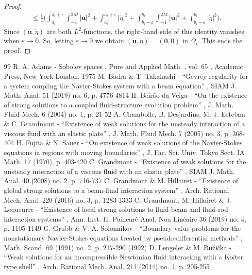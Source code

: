 \documentclass[11pt]{article}
\theoremstyle{remark}
\theoremstyle{definition}
\newcommand{\ug}{\boldsymbol{u}}
\newcommand{\BS}[1]{\boldsymbol{#1}}
\newcommand{\etap}{\dot{\eta}}
\begin{document}
\begin{proof}
\begin{multline}
\leq \frac{1}{4}\biggl(\int_{a_i}^{a_i+\varepsilon} \int_{-1}^{2M} \vert\ug\vert^{2}+\int_{a_i}^{a_i+\varepsilon}\vert\etap\vert^{2}
+\int_{b_i-\varepsilon}^{b_i} \int_{-1}^{2M} \vert\ug\vert^{2}+\int_{b_i-\varepsilon}^{b_i}\vert\etap\vert^{2} \biggr).
\end{multline}
Since $(\ug,\dot{\eta})$ are both $L^2$-functions, the right-hand side of this identity vanishes when $\varepsilon \to 0$. So, letting $\varepsilon\to 0$ we obtain $(\ug,\etap)=(\BS{0},0)$ in $\Omega_i$. This ends the proof.
\end{proof}


\begin{thebibliography}{99}
 R. A. Adams - Sobolev spaces , Pure and Applied Math. , vol. 65 , Academic Press, New York-London, 1975
 M. Badra \& T. Takahashi - “Gevrey regularity for a system coupling the Navier-Stokes system with a beam equation” , SIAM J. Math. Anal. 51 (2019) no. 6, p. 4776-4814
 H. Beirão da Veiga - “On the existence of strong solutions to a coupled fluid-structure evolution problem” , J. Math. Fluid Mech. 6 (2004) no. 1, p. 21-52
 A. Chambolle, B. Desjardins, M. J. Esteban \& C. Grandmont - “Existence of weak solutions for the unsteady interaction of a viscous fluid with an elastic plate” , J. Math. Fluid Mech. 7 (2005) no. 3, p. 368-404
 H. Fujita \& N. Sauer - “On existence of weak solutions of the Navier-Stokes equations in regions with moving boundaries” , J. Fac. Sci. Univ. Tokyo Sect. IA Math. 17 (1970), p. 403-420
 C. Grandmont - “Existence of weak solutions for the unsteady interaction of a viscous fluid with an elastic plate” , SIAM J. Math. Anal. 40 (2008) no. 2, p. 716-737
 C. Grandmont \& M. Hillairet - “Existence of global strong solutions to a beam-fluid interaction system” , Arch. Rational Mech. Anal. 220 (2016) no. 3, p. 1283-1333
 C. Grandmont, M. Hillairet \& J. Lequeurre - “Existence of local strong solutions to fluid-beam and fluid-rod interaction systems” , Ann. Inst. H. Poincaré Anal. Non Linéaire 36 (2019) no. 4, p. 1105-1149
 G. Grubb \& V. A. Solonnikov - “Boundary value problems for the nonstationary Navier-Stokes equations treated by pseudo-differential methods” , Math. Scand. 69 (1991) no. 2, p. 217-290 (1992)
 D. Lengeler \& M. Ružička - “Weak solutions for an incompressible Newtonian fluid interacting with a Koiter type shell” , Arch. Rational Mech. Anal. 211 (2014) no. 1, p. 205-255

\end{thebibliography}
\end{document}
